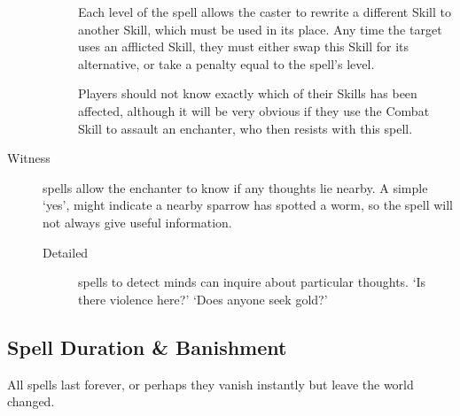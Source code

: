 \begin{multicols}{2}
\begin{description}
\begin{description}
        Each level of the spell allows the caster to rewrite a different Skill to another Skill, which must be used in its place.
        Any time the target uses an afflicted Skill, they must either swap this Skill for its alternative, or take a penalty equal to the spell's level.

        Players should not know exactly which of their Skills has been affected, although it will be very obvious if they use the Combat Skill to assault an enchanter, who then resists with this spell.
    \end{description}
  \item[Witness]
    spells allow the enchanter to know if any thoughts lie nearby.
    A simple `yes', might indicate a nearby sparrow has spotted a worm, so the spell will not always give useful information.
    \begin{description}
      \item[Detailed]
        spells to detect minds can inquire about particular thoughts.
        `Is there violence here?'
        `Does anyone seek gold?'
    \end{description}
\end{description}

\subsection{Spell Duration \& Banishment}

All spells last forever, or perhaps they vanish instantly but leave the world changed.


\end{multicols}
